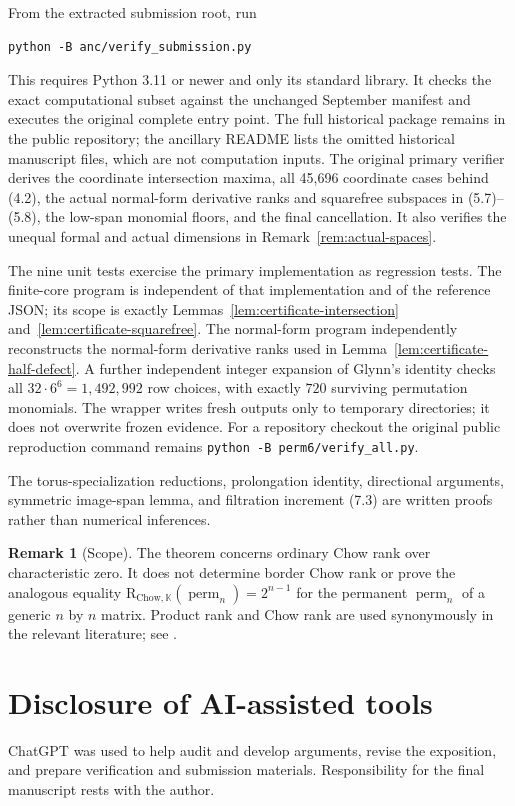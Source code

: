 \documentclass[11pt]{amsart}
\newcommand{\K}{\mathbb{K}}
\newcommand{\perm}{\operatorname{perm}}
\theoremstyle{definition}
\newtheorem{remark}[theorem]{Remark}
\begin{document}
From the extracted submission root, run
\begin{verbatim}
python -B anc/verify_submission.py
\end{verbatim}
This requires Python 3.11 or newer and only its standard library. It checks the exact computational subset against the unchanged September
manifest and executes the original complete
 entry point. The full historical package
remains in the public repository; the ancillary README lists the omitted
historical manuscript files, which are not computation inputs. The original primary
verifier derives the coordinate intersection maxima, all 45,696
coordinate cases behind (4.2), the actual normal-form derivative ranks and
squarefree subspaces in (5.7)--(5.8), the low-span monomial floors, and the
final cancellation. It also verifies the unequal formal and actual dimensions
in Remark~\ref{rem:actual-spaces}.

The nine unit tests exercise the primary implementation as regression tests.
The finite-core program is independent of that implementation and of the reference JSON;
its scope is exactly Lemmas~\ref{lem:certificate-intersection}
and~\ref{lem:certificate-squarefree}. The normal-form program independently
reconstructs the normal-form derivative ranks used in
Lemma~\ref{lem:certificate-half-defect}. A further independent integer
expansion of Glynn's identity checks all \(32\cdot6^6=1{,}492{,}992\)
row choices, with exactly \(720\) surviving permutation monomials.
The wrapper writes fresh outputs only to temporary directories; it does
not overwrite frozen evidence. For a repository checkout the original
public reproduction command remains \verb|python -B perm6/verify_all.py|.

The torus-specialization reductions, prolongation identity, directional
arguments, symmetric image-span lemma, and filtration increment (7.3) are
written proofs rather than numerical inferences.

\begin{remark}[Scope]
The theorem concerns ordinary Chow rank over characteristic zero. It does not
determine border Chow rank or prove the analogous equality
\(\mathrm{R}_{\mathrm{Chow},\K}(\perm_n)=2^{n-1}\) for the permanent
\(\perm_n\) of a generic \(n\) by \(n\) matrix. Product rank and Chow rank are
used synonymously in the relevant
literature; see \cite{IltenTeitler2016}.
\end{remark}

\section*{Disclosure of AI-assisted tools}
ChatGPT was used to help audit and develop arguments, revise the exposition,
and prepare verification and submission materials. Responsibility for the
final manuscript rests with the author.
\end{document}
